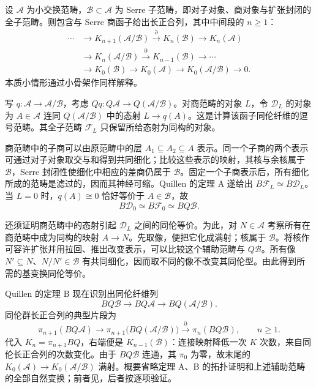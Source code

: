 \begin{theorem}\label{b4:thm:B-quillen-localization}
	设 \(\mathcal A\) 为小交换范畴，\(\mathcal B\subset\mathcal A\) 为 Serre 子范畴，即对子对象、商对象与扩张封闭的全子范畴。则包含与 Serre 商函子给出长正合列，其中中间段的 \(n\ge1\)：
	\[
		\begin{aligned}
			\cdots&\longrightarrow K_{n+1}(\mathcal A/\mathcal B) \xrightarrow{\partial}K_n(\mathcal B) \longrightarrow K_n(\mathcal A)\\
			&\longrightarrow K_n(\mathcal A/\mathcal B) \xrightarrow{\partial}K_{n-1}(\mathcal B)\longrightarrow\cdots\\
			&\longrightarrow K_0(\mathcal B)\longrightarrow K_0(\mathcal A) \longrightarrow K_0(\mathcal A/\mathcal B)\longrightarrow0.
		\end{aligned}
	\]
	本质小情形通过小骨架作同样解释。
\end{theorem}
\begin{proofsketch}
	写 \(q:\mathcal A\to\mathcal A/\mathcal B\)，考虑 \(Qq:Q\mathcal A\to Q(\mathcal A/\mathcal B)\)。对商范畴的对象 \(L\)，令 \(\mathcal D_L\) 的对象为 \(A\in\mathcal A\) 连同 \(Q(\mathcal A/\mathcal B)\) 中的态射 \(L\to q(A)\)。这是计算该函子同伦纤维的逗号范畴。其全子范畴 \(\mathcal F_L\) 只保留所给态射为同构的对象。

	商范畴中的子商可以由原范畴中的层 \(A_1\subseteq A_2\subseteq A\) 表示。同一个子商的两个表示可通过对子对象取交与和得到共同细化；比较这些表示的映射，其核与余核属于 \(\mathcal B\)，Serre 封闭性使细化中相应的差商仍属于 \(\mathcal B\)。固定一个子商表示后，所有细化所成的范畴是滤过的，因而其神经可缩。Quillen 的定理 A 遂给出 \(B\mathcal F_L\simeq B\mathcal D_L\)。当 \(L=0\) 时，\(q(A)\cong0\) 恰好等价于 \(A\in\mathcal B\)，故
	\[
		B\mathcal D_0\simeq B\mathcal F_0\simeq BQ\mathcal B.
	\]

	还须证明商范畴中的态射引起 \(\mathcal D_L\) 之间的同伦等价。为此，对 \(N\in\mathcal A\) 考察所有在商范畴中成为同构的映射 \(A\to N\)。先取像，便把它化成满射；核属于 \(\mathcal B\)。将核作可容许扩张并用拉回、推出改变表示，可以比较这个辅助范畴与 \(Q\mathcal B\)。所有像 \(N'\subseteq N\)、\(N/N'\in\mathcal B\) 有共同细化，因而取不同的像不改变其同伦型。由此得到所需的基变换同伦等价。

	Quillen 的定理 B 现在识别出同伦纤维列
	\[
		BQ\mathcal B\longrightarrow BQ\mathcal A \longrightarrow BQ(\mathcal A/\mathcal B).
	\]
	同伦群长正合列的典型片段为
	\[
		\pi_{n+1}(BQ\mathcal A) \longrightarrow\pi_{n+1}\bigl(BQ(\mathcal A/\mathcal B)\bigr) \xrightarrow{\partial}\pi_n(BQ\mathcal B), \qquad n\ge1.
	\]
	代入 \(K_n=\pi_{n+1}BQ\)，右端便是 \(K_{n-1}(\mathcal B)\)：连接映射降低一次 \(K\) 次数，来自同伦长正合列的次数变化。由于 \(BQ\mathcal B\) 连通，其 \(\pi_0\) 为零，故末尾的 \(K_0(\mathcal A)\to K_0(\mathcal A/\mathcal B)\) 满射。概要省略定理 A、B 的拓扑证明和上述辅助范畴的全部自然变换；前者见\cite[Chapter IV, Theorems 3.7--3.8]{Weibel2013KBook}，后者按\cite[Chapter V, Theorem 5.1, Claims 5.1.2--5.1.7]{Weibel2013KBook}逐项验证。
\end{proofsketch}

